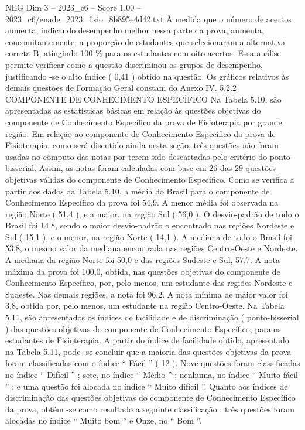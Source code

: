 \begin{textsample}{NEG Dim 3 – 2023\_c6 – Score 1.00 – 2023\_c6/enade\_2023\_fisio\_8b895e4d42.txt}
À medida que o número de acertos aumenta, indicando desempenho melhor nessa parte da prova, aumenta, concomitantemente, a proporção de estudantes que selecionaram a alternativa correta B, atingindo 100 \% para os estudantes com oito acertos.
Essa análise permite verificar como a questão discriminou os grupos de desempenho, justificando -se o alto índice ( 0,41 ) obtido na questão.
Os gráficos relativos às demais questões de Formação Geral constam do Anexo IV. 5.2.2 COMPONENTE DE CONHECIMENTO ESPECÍFICO Na Tabela 5.10, são apresentadas as estatísticas básicas em relação às questões objetivas do componente de Conhecimento Específico da prova de Fisioterapia por grande região.
Em relação ao componente de Conhecimento Específico da prova de Fisioterapia, como será discutido ainda nesta seção, três questões não foram usadas no cômputo das notas por terem sido descartadas pelo critério do ponto-bisserial.
Assim, as notas foram calculadas com base em 26 das 29 questões objetivas válidas do componente de Conhecimento Específico.
Como se verifica a partir dos dados da Tabela 5.10, a média do Brasil para o componente de Conhecimento Específico da prova foi 54,9.
A menor média foi observada na região Norte ( 51,4 ), e a maior, na região Sul ( 56,0 ).
O desvio-padrão de todo o Brasil foi 14,8, sendo o maior desvio-padrão o encontrado nas regiões Nordeste e Sul ( 15,1 ), e o menor, na região Norte ( 14,1 ).
A mediana de todo o Brasil foi 53,8, o mesmo valor da mediana encontrada nas regiões Centro-Oeste e Nordeste.
A mediana da região Norte foi 50,0 e das regiões Sudeste e Sul, 57,7.
A nota máxima da prova foi 100,0, obtida, nas questões objetivas do componente de Conhecimento Específico, por, pelo menos, um estudante das regiões Nordeste e Sudeste.
Nas demais regiões, a nota foi 96,2.
A nota mínima de maior valor foi 3,8, obtida por, pelo menos, um estudante na região Centro-Oeste.
Na Tabela 5.11, são apresentados os índices de facilidade e de discriminação ( ponto-bisserial ) das questões objetivas do componente de Conhecimento Específico, para os estudantes de Fisioterapia.
A partir do índice de facilidade obtido, apresentado na Tabela 5.11, pode -se concluir que a maioria das questões objetivas da prova foram classificadas com o índice “ Fácil ” ( 12 ).
Nove questões foram classificadas no índice “ Difícil ” ; sete, no índice “ Médio ” ; nenhuma, no índice “ Muito fácil ” ; e uma questão foi alocada no índice “ Muito difícil ”.
Quanto aos índices de discriminação das questões objetivas do componente de Conhecimento Específico da prova, obtém -se como resultado a seguinte classificação : três questões foram alocadas no índice “ Muito bom ” e Onze, no “ Bom ”.

\end{textsample}
